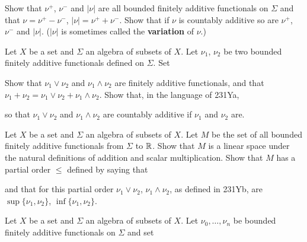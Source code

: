 {\noindent Show that $\nu^+$, $\nu^-$ and $|\nu|$ are all bounded 
finitely additive functionals on $\Sigma$ and that $\nu=\nu^+-\nu^-$, 
$|\nu|=\nu^++\nu^-$.   Show that if $\nu$ is countably additive so are 
$\nu^+$, $\nu^-$ and $|\nu|$.   ($|\nu|$ is sometimes called the {\bf 
variation} of $\nu$.) 
      
 Let $X$ be a set and $\Sigma$ an algebra of 
subsets of $X$.   Let $\nu_1$, $\nu_2$ be two bounded finitely additive 
functionals defined on $\Sigma$.   Set 
      
      
      
\noindent Show that $\nu_1\vee\nu_2$ and $\nu_1\wedge\nu_2$ are finitely 
additive functionals, and that 
$\nu_1+\nu_2=\nu_1\vee\nu_2+\nu_1\wedge\nu_2$. 
Show that, in the language of 231Ya, 
      
      
      
\noindent so that $\nu_1\vee\nu_2$ and $\nu_1\wedge\nu_2$ are countably 
additive if $\nu_1$ and $\nu_2$ are. 
      
 Let $X$ be a set and $\Sigma$ an algebra of 
subsets of $X$.   Let $M$ be the set of all bounded finitely additive 
functionals 
from $\Sigma$ to $\Bbb R$.   Show that $M$ is a linear space under the 
natural definitions of addition and scalar multiplication.   Show that 
$M$ has a partial order $\le$ defined by saying that 
      
      
\noindent and that for this partial order $\nu_1\vee\nu_2$, 
$\nu_1\wedge\nu_2$, as defined in 231Yb, are $\sup\{\nu_1,\nu_2\}$, 
$\inf\{\nu_1,\nu_2\}$. 
      
 Let $X$ be a set and $\Sigma$ an algebra of 
subsets of $X$.   Let $\nu_0,\ldots,\nu_n$ be bounded finitely additive 
functionals on $\Sigma$ and set 
      
      
}
